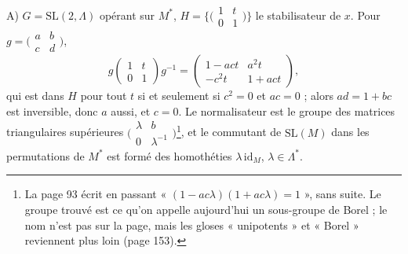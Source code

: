 \documentclass[11pt,a4paper]{article}
\begin{document}
A) $G = \mathrm{SL}(2, \Lambda)$ opérant sur $M^{*}$, $H = \bigl\{
\bigl(\begin{smallmatrix} 1 & t \\ 0 & 1 \end{smallmatrix}\bigr) \bigr\}$ le
stabilisateur de $x$. Pour $g = \bigl(\begin{smallmatrix} a & b \\ c & d
\end{smallmatrix}\bigr)$,
\[
  g \begin{pmatrix} 1 & t \\ 0 & 1 \end{pmatrix} g^{-1} =
  \begin{pmatrix} 1 - act & a^2 t \\ -c^2 t & 1 + act \end{pmatrix} ,
\]
qui est dans $H$ pour tout $t$ si et seulement si $c^2 = 0$ et $ac = 0$ ; alors
$ad = 1 + bc$ est inversible, donc $a$ aussi, et $c = 0$. Le normalisateur est
le groupe des matrices triangulaires supérieures $\bigl(\begin{smallmatrix}
\lambda & b \\ 0 & \lambda^{-1} \end{smallmatrix}\bigr)$\footnote{La page 93
écrit en passant « $(1 - ac\lambda)(1 + ac\lambda) = 1$ », sans suite. Le
groupe trouvé est ce qu'on appelle aujourd'hui un sous-groupe de Borel ; le nom
n'est pas sur la page, mais les gloses « unipotents » et « Borel » reviennent
plus loin (page 153).}, et le commutant de $\mathrm{SL}(M)$ dans les
permutations de $M^{*}$ est formé des homothéties $\lambda\,\mathrm{id}_M$,
$\lambda \in \Lambda^{*}$.
\end{document}
